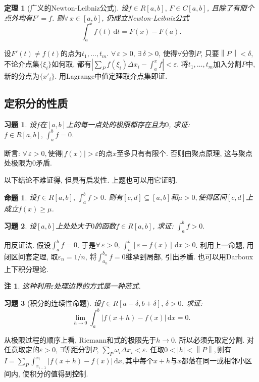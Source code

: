 \documentclass[11pt,a4paper]{ctexart}
\makeatletter
\theoremstyle{thmseries} %
\newtheorem{thm}{定理}[section]
\newtheorem{prop}{命题}[section]
\theoremstyle{exerseries}
\newtheorem{exer}{习题}[section]
\newtheorem*{rem}{注}
\renewenvironment{proof}[1][\proofname]{\par
  \pushQED{\qed}%
  \normalfont \topsep6\p@\@plus6\p@\relax
  \trivlist
  \item[\hskip\labelsep
        \itshape
    #1\@addpunct{}]\ignorespaces
}{%
  \popQED\endtrivlist\@endpefalse
}
\newenvironment{pf}{\begin{proof}[\bfseries\upshape 证\quad]}{\end{proof}}
\newcommand{\norm}[1]{\left\lVert #1 \right\rVert}
\renewcommand{\epsilon}{\varepsilon}
\renewcommand{\d}{\mathrm{d}}
\makeatother
\begin{document}
\begin{thm}[广义的Newton-Leibniz公式]
	设$f\in R[a,b],\,F\in C[a,b]$, 且除了有限个点外均有$F'=f$. 则$\forall\,x\in[a,b]$, 仍成立Newton-Leibniz公式
	\[\int_{a}^{x}f(t)\,\d t=F(x)-F(a).\]
\end{thm}
\begin{pf}
	设$F'(t)\neq f(t)$的点为$t_1,\dots,t_m$. $\forall\,\epsilon>0,\,\exists\,\delta>0$, 使得$\forall$分割$P$, 只要$\norm{P}<\delta$, 不论介点集$\{\xi_i\}$如何取, 都有$\textstyle\left|\sum_P f(\xi_i)\Delta x_i-\int_{a}^{x}f\right|<\epsilon$. 将$t_1,\dots,t_m$加入分割$P$中, 新的分点为$\{x'_i\}$. 用Lagrange中值定理取介点集即证. 
\end{pf}


\subsection{定积分的性质}
\begin{exer}
	设$f$在$[a,b]$上的每一点处的极限都存在且为$0$, 求证: $f\in R[a,b],\,\int_{a}^{b}f=0$. 
\end{exer}
\begin{pf}
	断言: $\forall\,\epsilon>0,$使得$|f(x)|>\epsilon$的点$x$至多只有有限个. 否则由聚点原理, 这与聚点处极限为0矛盾. 
\end{pf}

以下结论不难证得, 但具有启发性. 上题也可以用它证明. 
\begin{prop}
	设$f\in R[a,b],\,\int_{a}^{b}f>0$. 则有$[c,d]\subseteq[a,b]$和$\mu>0,$使得区间$[c,d]$上成立$f(x)\geq\mu$. 
\end{prop}

\begin{exer}
	设$[a,b]$上处处大于$0$的函数$f\in R[a,b]$, 求证: $\int_{a}^{b}f>0.$
\end{exer}
\begin{pf}
	用反证法. 假设$\int_{a}^{b}f=0$. 于是$\forall\,\epsilon>0,\,\int_{a}^{b}[\epsilon-f(x)]\,\d x>0$. 利用上一命题, 用闭区间套定理, 取$\epsilon_n=1/n$, 将$\int_{a_n}^{b_n}f=0$继承到局部, 引出矛盾. 也可以用Darboux上下积分理论. 
\end{pf}
\begin{rem}
	这种利用$\epsilon$处理边界的方式是一种范式. 
\end{rem}

\begin{exer}[积分的连续性命题]
	设$f\in R[a-\delta,b+\delta],\,\delta>0$. 求证:
	\[\lim_{h\to0}\int_{a}^{b}|f(x+h)-f(x)|\,\d x=0.\]
\end{exer}
\begin{pf}\everymath{\textstyle}
	从极限过程的顺序上看, Riemann和式的极限先于$h\to0$. 所以必须先取定分割. 对任意取定的$\epsilon>0,\,\exists$等距分割$P,\,\sum_P \omega_i\Delta x_i<\epsilon$. 任取$0<|h|<\norm{P},$则有
	$I=\sum_P \int_{x_{i-1}}^{x_i}|f(x+h)-f(x)|\,\d x,$其中每个$x+h$与$x$都落在同一或相邻小区间内, 使积分的值得到控制. 
\end{pf}
\end{document}
